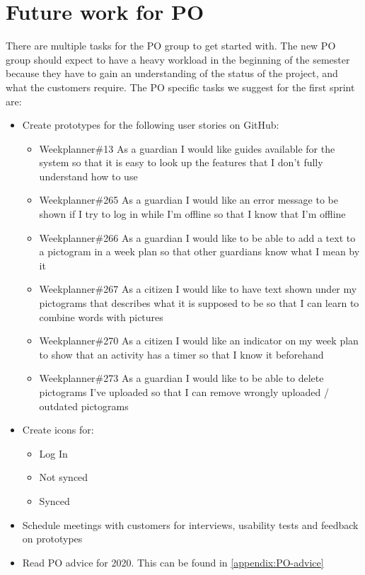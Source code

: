 \section{Future work for PO}
There are multiple tasks for the PO group to get started with.
The new PO group should expect to have a heavy workload in the beginning of the semester because they have to gain an understanding of the status of the project, and what the customers require.
The PO specific tasks we suggest for the first sprint are:

\begin{itemize}
    \item Create prototypes for the following user stories on GitHub:
    \begin{itemize}
        \item Weekplanner\#13 As a guardian I would like guides available for the system so that it is easy to look up the features that I don't fully understand how to use
        \item Weekplanner\#265 As a guardian I would like an error message to be shown if I try to log in while I'm offline so that I know that I'm offline
        \item Weekplanner\#266 As a guardian I would like to be able to add a text to a pictogram in a week plan so that other guardians know what I mean by it
        \item Weekplanner\#267 As a citizen I would like to have text shown under my pictograms that describes what it is supposed to be so that I can learn to combine words with pictures 
        \item Weekplanner\#270 As a citizen I would like an indicator on my week plan to show that an activity has a timer so that I know it beforehand
        \item Weekplanner\#273 As a guardian I would like to be able to delete pictograms I've uploaded so that I can remove wrongly uploaded / outdated pictograms 
    \end{itemize}
    \item Create icons for:
    \begin{itemize}
        \item Log In
        \item Not synced
        \item Synced
    \end{itemize}
    \item Schedule meetings with customers for interviews, usability tests and feedback on prototypes
    \item Read PO advice for 2020. This can be found in \autoref{appendix:PO-advice}
\end{itemize}
